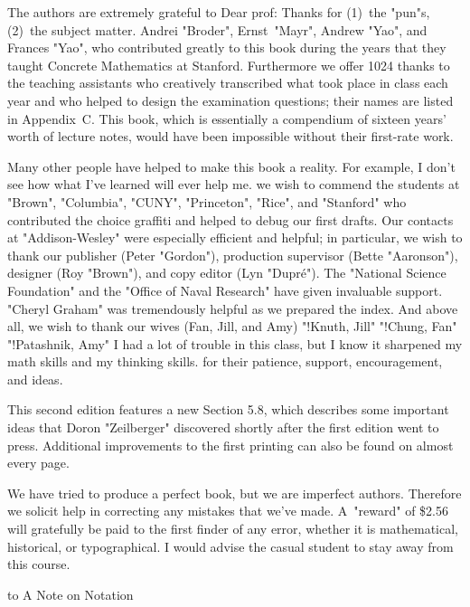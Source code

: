 The authors are extremely grateful to
\g Dear prof: Thanks for (1)~the "pun"s, (2)~the subject matter.\g
Andrei "Broder", Ernst~"Mayr",
Andrew "Yao", and Frances "Yao", who contributed
greatly to this book during the years that they taught Concrete
Mathematics at Stanford.
 Furthermore we offer 1024 thanks to the
teaching assistants who creatively transcribed what took place in class
each year and who helped to design the examination questions; their
names are listed in Appendix~C\null. This book, which is essentially a
compendium of sixteen years' worth of lecture notes, would have
been impossible without their first-rate work.

Many other people have helped to make this book a reality. For example,
\g I don't see how what I've learned will ever help me.\g
we wish to commend the students at "Brown", "Columbia", "CUNY",
"Princeton", "Rice", and "Stanford"
who contributed the choice graffiti and helped to debug our first drafts.
Our contacts at "Addison-Wesley" were especially efficient and helpful;
in particular, we wish to thank our publisher (Peter "Gordon"), production
supervisor (Bette "Aaronson"), designer (Roy "Brown"), and copy editor
(Lyn "Dupr\'e"). The "National Science Foundation" and the "Office of Naval
Research" have given invaluable support.
"Cheryl Graham" was tremendously helpful as we prepared the index.
 And above all, we wish to thank our wives (Fan, Jill, and Amy)
"!Knuth, Jill" "!Chung, Fan" "!Patashnik, Amy"
\g I had a lot of trouble in this class, but I know it sharpened my
math skills and my thinking skills.\g
for their patience, support, encouragement, and ideas.

This second edition features a new Section 5.8, which describes some
important ideas that Doron "Zeilberger" discovered shortly after the first
edition went to press. Additional improvements to the first printing can
also be found on almost every page.

We have tried to produce a perfect book, but we are imperfect authors.
Therefore we solicit help in correcting any mistakes that we've made.
A~"reward" of \$2.56 will gratefully be paid to the first finder of
any error, whether it is mathematical, historical, or typographical.
\g I would advise the casual student to stay away from this course.\g

\smallskip
{\advance\baselineskip-1pt
\halign to
}
\vfill\eject
{}
\beginchapter {} A Note on Notation

